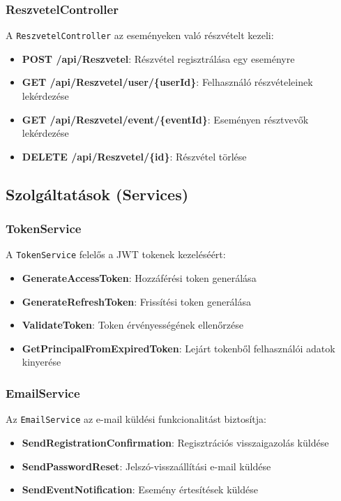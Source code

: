 \documentclass[colorlinks]{thesis-kando}
\theoremstyle{definition}
\theoremstyle{remark}
\begin{document}
 \subsubsection{ReszvetelController}
 
 A \texttt{ReszvetelController} az eseményeken való részvételt kezeli:
 
 \begin{itemize}
 	\item \textbf{POST /api/Reszvetel}: Részvétel regisztrálása egy eseményre
 	\item \textbf{GET /api/Reszvetel/user/\{userId\}}: Felhasználó részvételeinek lekérdezése
 	\item \textbf{GET /api/Reszvetel/event/\{eventId\}}: Eseményen résztvevők lekérdezése
 	\item \textbf{DELETE /api/Reszvetel/\{id\}}: Részvétel törlése
 \end{itemize}
 
 \subsection{Szolgáltatások (Services)}
 
 \subsubsection{TokenService}
 
 A \texttt{TokenService} felelős a JWT tokenek kezeléséért:
 
 \begin{itemize}
 	\item \textbf{GenerateAccessToken}: Hozzáférési token generálása
 	\item \textbf{GenerateRefreshToken}: Frissítési token generálása
 	\item \textbf{ValidateToken}: Token érvényességének ellenőrzése
 	\item \textbf{GetPrincipalFromExpiredToken}: Lejárt tokenből felhasználói adatok kinyerése
 \end{itemize}
 
 \subsubsection{EmailService}
 
 Az \texttt{EmailService} az e-mail küldési funkcionalitást biztosítja:
 
 \begin{itemize}
 	\item \textbf{SendRegistrationConfirmation}: Regisztrációs visszaigazolás küldése
 	\item \textbf{SendPasswordReset}: Jelszó-visszaállítási e-mail küldése
 	\item \textbf{SendEventNotification}: Esemény értesítések küldése
 \end{itemize}
 
\end{document}
